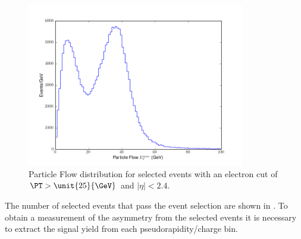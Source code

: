 \begin{figure}[htbp]
  \begin{center}
    \includegraphics*[width=0.85\textwidth]{pfmet_dist}
    \caption[Particle Flow \ETm distribution for selected events.]{Particle Flow
\ETm distribution for selected events with an electron cut of $\PT >
\unit{25}{\GeV}$ and $|\eta| < 2.4$\cite{baisini2010electron}.\label{fig:pfmet_dist_36}}
  \end{center}
\end{figure}

The number of selected events that pass the
event selection are shown in . To obtain a
measurement of the asymmetry from the selected events it is necessary to extract
the signal yield from each pseudorapidity/charge bin.

